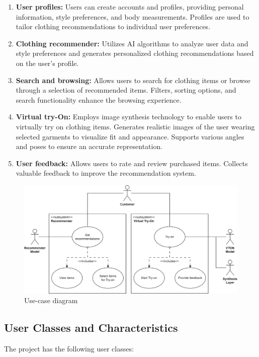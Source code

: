 		\begin{enumerate}
			\item \textbf{User profiles:} Users can create accounts and profiles, providing personal information, style preferences, and body measurements. Profiles are used to tailor clothing recommendations to individual user preferences.
			\item \textbf{Clothing recommender:} Utilizes AI algorithms to analyze user data and style preferences and generates personalized clothing recommendations based on the user's profile.
			\item \textbf{Search and browsing:} Allows users to search for clothing items or browse through a selection of recommended items. Filters, sorting options, and search functionality enhance the browsing experience.
			\item \textbf{Virtual try-On:} Employs image synthesis technology to enable users to virtually try on clothing items. Generates realistic images of the user wearing selected garments to visualize fit and appearance. Supports various angles and poses to ensure an accurate representation.
			\item \textbf{User feedback:} Allows users to rate and review purchased items. Collects valuable feedback to improve the recommendation system.
		\end{enumerate}

		\begin{figure}
			\includegraphics[width=\textwidth]{components/images/use-case.png}
			\caption{Use-case diagram}
			\label{fig:use-case}
		\end{figure}

	\subsection{User Classes and Characteristics}
		The project has the following user classes: 

